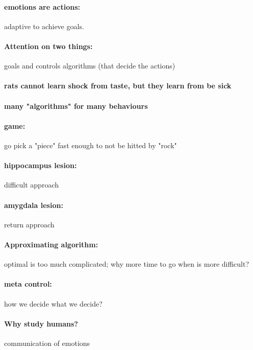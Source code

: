 \documentclass[12pt,article,oneside,a4paper]{memoir}
\begin{document}
\paragraph{emotions are actions:} adaptive to achieve goals.
\paragraph{Attention on two things:} goals and controls algorithms (that decide the actions)

\paragraph{rats cannot learn shock from taste, but they learn from be sick}

\paragraph{many "algorithms" for many behaviours}

\paragraph{game:} go pick a "piece" fast enough to not be hitted by "rock"

\paragraph{hippocampus lesion:} difficult approach
\paragraph{amygdala lesion:} return approach

\paragraph{Approximating algorithm: } optimal is too much complicated; why more time to go when is more difficult?

\paragraph{meta control:} how we decide what we decide?

\paragraph{Why study humans?} communication of emotions
\end{document}
